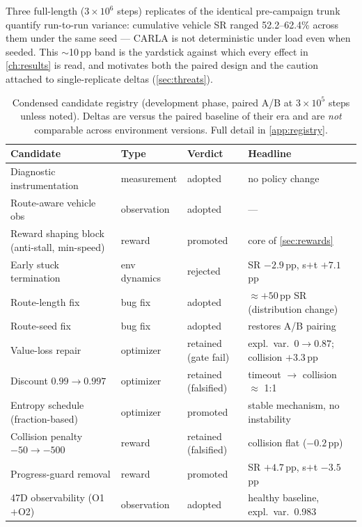 Three full-length ($3\times10^{6}$ steps) replicates of the identical
pre-campaign trunk quantify run-to-run variance: cumulative vehicle SR
ranged 52.2--62.4\% across them under the same seed --- CARLA is not
deterministic under load even when seeded. This $\sim$10\,pp band is the
yardstick against which every effect in \cref{ch:results} is read, and
motivates both the paired design and the caution attached to
single-replicate deltas (\cref{sec:threats}).

\begin{table}[t]
  \centering\small
  \caption{Condensed candidate registry (development phase, paired A/B at
  $3\times10^{5}$ steps unless noted). Deltas are versus the paired
  baseline of their era and are \emph{not} comparable across environment
  versions. Full detail in \cref{app:registry}.}
  \label{tab:candidates}
  \begin{tabular}{@{}p{4.2cm}p{2.6cm}p{2.2cm}p{3.6cm}@{}}
    \toprule
    Candidate & Type & Verdict & Headline \\
    \midrule
    Diagnostic instrumentation & measurement & adopted & no policy change \\
    Route-aware vehicle obs & observation & adopted & --- \\
    Reward shaping block (anti-stall, min-speed) & reward & promoted & core of \cref{sec:rewards} \\
    Early stuck termination & env dynamics & rejected & SR $-2.9$\,pp, s$+$t $+7.1$\,pp \\
    Route-length fix & bug fix & adopted & $\approx +50$\,pp SR (distribution change) \\
    Route-seed fix & bug fix & adopted & restores A/B pairing \\
    Value-loss repair & optimizer & retained (gate fail) & expl.\ var.\ $0 \to 0.87$; collision $+3.3$\,pp \\
    Discount $0.99 \to 0.997$ & optimizer & retained (falsified) & timeout $\to$ collision $\approx$ 1:1 \\
    Entropy schedule (fraction-based) & optimizer & promoted & stable mechanism, no instability \\
    Collision penalty $-50 \to -500$ & reward & retained (falsified) & collision flat ($-0.2$\,pp) \\
    Progress-guard removal & reward & promoted & SR $+4.7$\,pp, s$+$t $-3.5$\,pp \\
    47D observability (O1$+$O2) & observation & adopted & healthy baseline, expl.\ var.\ 0.983 \\

\end{tabular}
\end{table}
